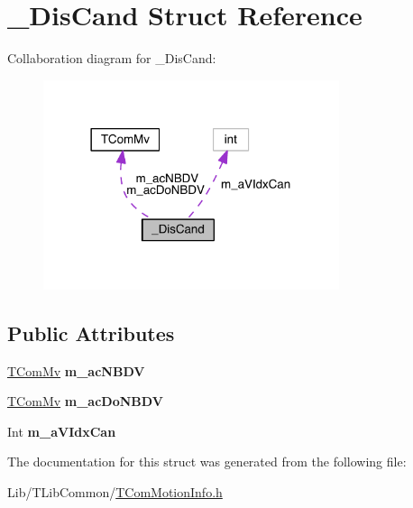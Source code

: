 \hypertarget{struct___dis_cand}{}\section{\+\_\+\+Dis\+Cand Struct Reference}
\label{struct___dis_cand}


Collaboration diagram for \+\_\+\+Dis\+Cand\+:
\nopagebreak
\begin{figure}[H]
\begin{center}
\leavevmode
\includegraphics[width=246pt]{d9/da0/struct___dis_cand__coll__graph}
\end{center}
\end{figure}
\subsection*{Public Attributes}
\begin{DoxyCompactItemize}
\item 
\mbox{\label{struct___dis_cand_afd2a831262d6388645ce6432577bebe5}} 
\hyperlink{class_t_com_mv}{T\+Com\+Mv} {\bfseries m\+\_\+ac\+N\+B\+DV}
\item 
\mbox{\label{struct___dis_cand_a1da3259ad5d1438cdb4ffea95f6dc274}} 
\hyperlink{class_t_com_mv}{T\+Com\+Mv} {\bfseries m\+\_\+ac\+Do\+N\+B\+DV}
\item 
\mbox{\label{struct___dis_cand_a4dce20e1ebd1cbdb8e8e390d2945fcc1}} 
Int {\bfseries m\+\_\+a\+V\+Idx\+Can}
\end{DoxyCompactItemize}


The documentation for this struct was generated from the following file\+:\begin{DoxyCompactItemize}
\item 
Lib/\+T\+Lib\+Common/\hyperlink{_t_com_motion_info_8h}{T\+Com\+Motion\+Info.\+h}\end{DoxyCompactItemize}
